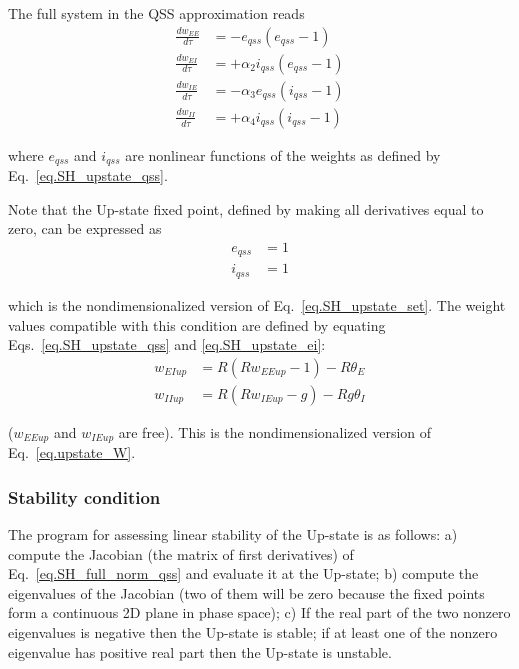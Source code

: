 \documentclass[twocolumn]{article}
\newcommand{\EE}{\mathit{EE}}
\newcommand{\EI}{\mathit{EI}}
\newcommand{\IE}{\mathit{IE}}
\newcommand{\II}{\mathit{II}}
\newcommand{\up}{\mathit{up}}
\newcommand{\qss}{\mathit{qss}}
\begin{document}
The full system in the QSS approximation reads
\begin{equation}
\begin{aligned}
\frac{dw_{\EE}}{d\tau} & = -e_{\qss}(e_{\qss}-1) \\
\frac{dw_{\EI}}{d\tau} & = +\alpha_2 i_{\qss}(e_{\qss}-1) \\
\frac{dw_{\IE}}{d\tau} & = -\alpha_3 e_{\qss}(i_{\qss}-1) \\
\frac{dw_{\II}}{d\tau} & = +\alpha_4 i_{\qss}(i_{\qss}-1)
\end{aligned}
\label{eq.SH_full_norm_qss}
\end{equation}

\noindent where $e_{\qss}$ and $i_{\qss}$ are nonlinear functions of the weights as defined by Eq.\ \ref{eq.SH_upstate_qss}.

Note that the Up-state fixed point, defined by making all derivatives equal to zero, can be expressed as
\begin{equation}
\begin{aligned}
e_{\qss} & = 1 \\
i_{\qss} & = 1
\end{aligned}
\label{eq.SH_upstate_ei}
\end{equation}

\noindent which is the nondimensionalized version of Eq.\ \ref{eq.SH_upstate_set}. The weight values compatible with this condition are defined by equating Eqs.\ \ref{eq.SH_upstate_qss} and \ref{eq.SH_upstate_ei}:
\begin{equation}
\begin{aligned}
w_{\EI\up} & = R (Rw_{\EE\up} - 1) - R \theta_E \\
w_{\II\up} & = R (Rw_{\IE\up} - g) - Rg \theta_I
\end{aligned}
\label{eq.SH_upstate_w}
\end{equation}

\noindent ($w_{\EE\up}$ and $w_{\IE\up}$ are free). This is the nondimensionalized version of Eq.\ \ref{eq.upstate_W}.


\subsubsection{Stability condition}

The program for assessing linear stability of the Up-state is as follows: a) compute the Jacobian (the matrix of first derivatives) of Eq.\ \ref{eq.SH_full_norm_qss} and evaluate it at the Up-state; b) compute the eigenvalues of the Jacobian (two of them will be zero because the fixed points form a continuous 2D plane in phase space); c) If the real part of the two nonzero eigenvalues is negative then the Up-state is stable; if at least one of the nonzero eigenvalue has positive real part then the Up-state is unstable.
\end{document}
